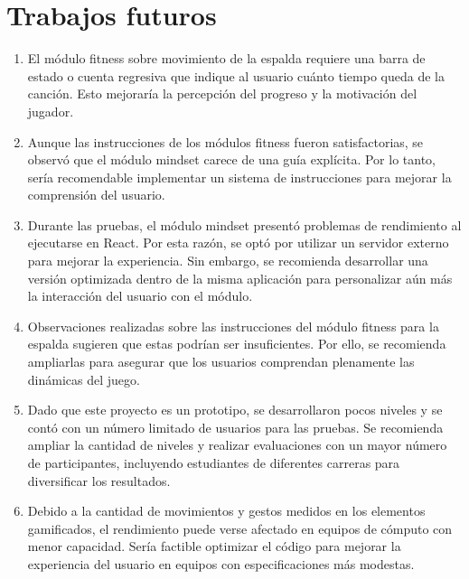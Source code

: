 \section{Trabajos futuros}

\begin{enumerate}
    \item El módulo fitness sobre movimiento de la espalda requiere una barra de estado o cuenta regresiva que indique al usuario cuánto tiempo queda de la canción. Esto mejoraría la percepción del progreso y la motivación del jugador.
    
    \item Aunque las instrucciones de los módulos fitness fueron satisfactorias, se observó que el módulo mindset carece de una guía explícita. Por lo tanto, sería recomendable implementar un sistema de instrucciones para mejorar la comprensión del usuario.
    
    \item Durante las pruebas, el módulo mindset presentó problemas de rendimiento al ejecutarse en React. Por esta razón, se optó por utilizar un servidor externo para mejorar la experiencia. Sin embargo, se recomienda desarrollar una versión optimizada dentro de la misma aplicación para personalizar aún más la interacción del usuario con el módulo.
    
    \item Observaciones realizadas sobre las instrucciones del módulo fitness para la espalda sugieren que estas podrían ser insuficientes. Por ello, se recomienda ampliarlas para asegurar que los usuarios comprendan plenamente las dinámicas del juego.
    
    \item Dado que este proyecto es un prototipo, se desarrollaron pocos niveles y se contó con un número limitado de usuarios para las pruebas. Se recomienda ampliar la cantidad de niveles y realizar evaluaciones con un mayor número de participantes, incluyendo estudiantes de diferentes carreras para diversificar los resultados.
    
    \item Debido a la cantidad de movimientos y gestos medidos en los elementos gamificados, el rendimiento puede verse afectado en equipos de cómputo con menor capacidad. Sería factible optimizar el código para mejorar la experiencia del usuario en equipos con especificaciones más modestas.
\end{enumerate}